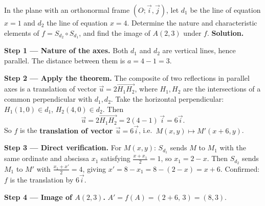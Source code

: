 \documentclass[11pt]{article}
\begin{document}
\begin{exoresolu}
In the plane with an orthonormal frame $(O;\vec{i},\vec{j})$, let $d_1$ be the line of equation $x = 1$ and $d_2$ the line of equation $x = 4$. Determine the nature and characteristic elements of $f = S_{d_2} \circ S_{d_1}$, and find the image of $A(2,3)$ under $f$.
\tcblower
\textbf{Solution.}

\textbf{Step 1 — Nature of the axes.} Both $d_1$ and $d_2$ are vertical lines, hence parallel. The distance between them is $a = 4 - 1 = 3$.

\textbf{Step 2 — Apply the theorem.} The composite of two reflections in parallel axes is a translation of vector $\vec{u} = 2\overrightarrow{H_1H_2}$, where $H_1, H_2$ are the intersections of a common perpendicular with $d_1, d_2$. Take the horizontal perpendicular: $H_1(1,0) \in d_1$, $H_2(4,0) \in d_2$. Then
\[ \vec{u} = 2\overrightarrow{H_1H_2} = 2(4-1)\,\vec{i} = 6\vec{i}. \]
So $f$ is the \textbf{translation of vector $\vec{u} = 6\vec{i}$}, i.e.\ $M(x,y) \mapsto M'(x+6, y)$.

\textbf{Step 3 — Direct verification.} For $M(x,y)$: $S_{d_1}$ sends $M$ to $M_1$ with the same ordinate and abscissa $x_1$ satisfying $\frac{x+x_1}{2} = 1$, so $x_1 = 2 - x$. Then $S_{d_2}$ sends $M_1$ to $M'$ with $\frac{x_1 + x'}{2} = 4$, giving $x' = 8 - x_1 = 8 - (2-x) = x + 6$. Confirmed: $f$ is the translation by $6\vec{i}$.

\textbf{Step 4 — Image of $A(2,3)$.} $A' = f(A) = (2+6,\, 3) = (8,3)$.
\end{exoresolu}
\end{document}
